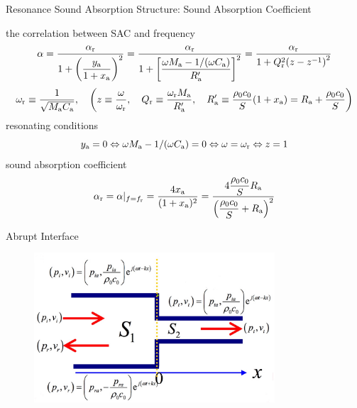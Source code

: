 \documentclass[9pt,mathserif]{beamer}
\begin{document}
\begin{frame}{Resonance Sound Absorption Structure: Sound Absorption Coefficient}
	\begin{outline}
		\1 the correlation between SAC and frequency
		$$
		\alpha = \frac{\alpha_\text{r}}{1+\qty(\dfrac{y_\text{a}}{1+x_\text{a}})^2}
		=\frac{\alpha_\text{r}}{1+\qty[\dfrac{\omega M_\text{a} - 1/(\omega C_\text{a})}{
		R_\text{a}'}]^2} = \frac{\alpha_\text{r}}{1+Q_\text{r}^2\qty(z-z^{-1})^2}
		$$
		$$
		\omega\st{r}\equiv \frac{1}{\sqrt{M\st{a}C\st{a}}}\qc
		\qty(z\equiv \frac{\omega}{\omega\st{r}}
		\qc 
		Q\st{r}\equiv \frac{\omega\st{r}M\st{a}}{R\st{a}'}
		\qc 
		R\st{a}'\equiv \frac{\rho_0c_0}{S}(1+x\st{a})
		=R\st{a} +\frac{\rho_0c_0}{S})
		$$
		\1 resonating conditions
		$$y_\text{a}=0 \Leftrightarrow \omega M_\text{a}-1/(\omega C_\text{a}) = 0
		\Leftrightarrow \omega = \omega_\text{r}\Leftrightarrow
		z=1$$
		\1 sound absorption coefficient
		$$\alpha_\text{r} = \alpha|_{f=f_\text{r}} = \frac{4x_\text{a}}{(1+x_\text{a})^2}
		=\frac{4\dfrac{\rho_0c_0}{S}R_\text{a}}{\qty(\dfrac{\rho_0c_0}{S}+R_\text{a})^2}
		$$
	\end{outline}
\end{frame}


\begin{frame}{Abrupt Interface}
	\begin{figure}
		\centering
		\includegraphics[width=0.8\textwidth]{img/duct/abruptInterface.jpg}
	\end{figure}
\end{frame}
\end{document}

